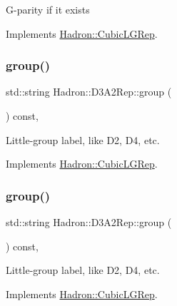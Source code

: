 G-\/parity if it exists 

Implements \mbox{\hyperlink{structHadron_1_1CubicLGRep_ace26f7b2d55e3a668a14cb9026da5231}{Hadron\+::\+Cubic\+L\+G\+Rep}}.

\mbox{\label{structHadron_1_1D3A2Rep_aca0f5e39c00819bb490bfd5e9cf82c9e}} 
\subsubsection{\texorpdfstring{group()}{group()}\hspace{0.1cm}{\footnotesize\ttfamily [1/5]}}
{\footnotesize\ttfamily std\+::string Hadron\+::\+D3\+A2\+Rep\+::group (\begin{DoxyParamCaption}{ }\end{DoxyParamCaption}) const\hspace{0.3cm}{\ttfamily [inline]}, {\ttfamily [virtual]}}

Little-\/group label, like D2, D4, etc. 

Implements \mbox{\hyperlink{structHadron_1_1CubicLGRep_a9bdb14b519a611d21379ed96a3a9eb41}{Hadron\+::\+Cubic\+L\+G\+Rep}}.

\mbox{\label{structHadron_1_1D3A2Rep_aca0f5e39c00819bb490bfd5e9cf82c9e}} 
\subsubsection{\texorpdfstring{group()}{group()}\hspace{0.1cm}{\footnotesize\ttfamily [2/5]}}
{\footnotesize\ttfamily std\+::string Hadron\+::\+D3\+A2\+Rep\+::group (\begin{DoxyParamCaption}{ }\end{DoxyParamCaption}) const\hspace{0.3cm}{\ttfamily [inline]}, {\ttfamily [virtual]}}

Little-\/group label, like D2, D4, etc. 

Implements \mbox{\hyperlink{structHadron_1_1CubicLGRep_a9bdb14b519a611d21379ed96a3a9eb41}{Hadron\+::\+Cubic\+L\+G\+Rep}}.

\mbox{\label{structHadron_1_1D3A2Rep_aca0f5e39c00819bb490bfd5e9cf82c9e}} 
